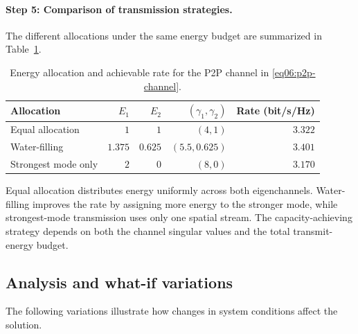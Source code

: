 \paragraph{Step 5: Comparison of transmission strategies.}
The different allocations under the same energy budget are summarized in Table~\ref{tab06:p2p-comparison}.
\begin{table}[htbp]
	\centering
	\caption{Energy allocation and achievable rate for the P2P channel in \eqref{eq06:p2p-channel}.}
	\label{tab06:p2p-comparison}
	\begin{tabular}{lrrrr}
		\toprule
		Allocation & $E_1$ & $E_2$ & $(\gamma_1,\gamma_2)$ & Rate (bit/s/Hz)\\
		\midrule
		Equal allocation & $1$ & $1$ & $(4,1)$ & $3.322$\\
		Water-filling & $1.375$ & $0.625$ & $(5.5,0.625)$ & $3.401$\\
		Strongest mode only & $2$ & $0$ & $(8,0)$ & $3.170$\\
		\bottomrule
	\end{tabular}
\end{table}
Equal allocation distributes energy uniformly across both eigenchannels. Water-filling improves the rate by assigning more energy to the stronger mode, while strongest-mode transmission uses only one spatial stream. The capacity-achieving strategy depends on both the channel singular values and the total transmit-energy budget.

\subsection{Analysis and what-if variations}
The following variations illustrate how changes in system conditions affect the solution.


